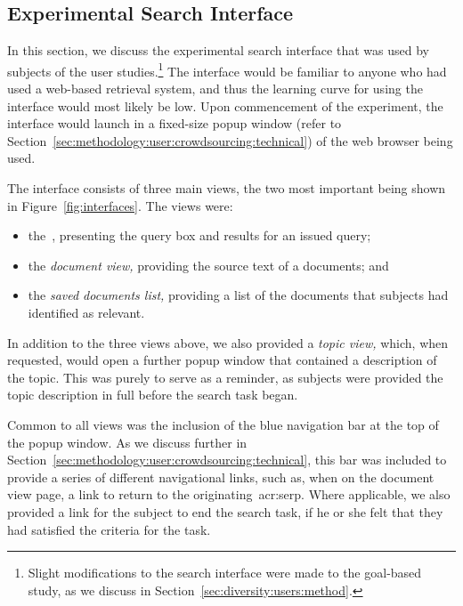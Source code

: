 \subsection{Experimental Search Interface}\label{sec:methodology:user:interface}
In this section, we discuss the experimental search interface that was used by subjects of the user studies.\footnote{Slight modifications to the search interface were made to the goal-based study, as we discuss in Section~\ref{sec:diversity:users:method}.} The interface would be familiar to anyone who had used a web-based retrieval system, and thus the learning curve for using the interface would most likely be low. Upon commencement of the experiment, the interface would launch in a fixed-size popup window (refer to Section~\ref{sec:methodology:user:crowdsourcing:technical}) of the web browser being used.

The interface consists of three main views, the two most important being shown in Figure~\ref{fig:interfaces}. The views were:

\begin{itemize}
    \item{the~, presenting the query box and results for an issued query;}
    \item{the \emph{document view,} providing the source text of a documents; and}
    \item{the \emph{saved documents list,} providing a list of the documents that subjects had identified as relevant.}
\end{itemize}

In addition to the three views above, we also provided a \emph{topic view,} which, when requested, would open a further popup window that contained a description of the topic. This was purely to serve as a reminder, as subjects were provided the topic description in full before the search task began.

Common to all views was the inclusion of the blue navigation bar at the top of the popup window. As we discuss further in Section~\ref{sec:methodology:user:crowdsourcing:technical}, this bar was included to provide a series of different navigational links, such as, when on the document view page, a link to return to the originating~\gls{acr:serp}. Where applicable, we also provided a link for the subject to end the search task, if he or she felt that they had satisfied the criteria for the task.

